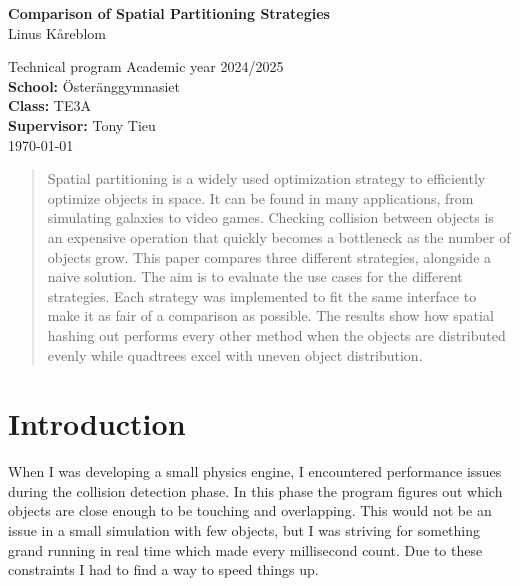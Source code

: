 \documentclass[a4paper, 12pt]{article}
\begin{document}
\begin{titlepage}
    \centering
    \vspace*{1cm}

    {\Huge \textbf{Comparison of Spatial Partitioning Strategies}}\\[1.5cm]

    {\large Linus Kåreblom}\\[1cm]

    \vfill

    Technical program Academic year 2024/2025\\
    \textbf{School:} Österänggymnasiet\\
    \textbf{Class:} TE3A\\
    \textbf{Supervisor:} Tony Tieu\\

    \vspace{1cm}
    {\today}
\end{titlepage}

\begin{abstract}
    Spatial partitioning is a widely used optimization strategy to efficiently
    optimize objects in space. It can be found in many applications, from
    simulating galaxies to video games.
    Checking collision between objects is an expensive operation that quickly
    becomes a bottleneck as the number of objects grow.
    This paper compares three different strategies, alongside a naive solution.
    The aim is to evaluate the use cases for the different strategies.
    Each strategy was implemented to fit the same interface to make it as fair
    of a comparison as possible.
    The results show how spatial hashing out performs every other method when
    the objects are distributed evenly while quadtrees excel with uneven object
    distribution.
\end{abstract}

\newpage

\tableofcontents
\newpage

\section{Introduction}
When I was developing a small physics engine, I encountered performance issues
during the  collision detection phase. In this phase the program figures out
which objects are close enough to be touching and overlapping. This would not be
an issue in a small simulation with few objects, but I was striving for
something grand running in real time which made every millisecond count. Due to
these constraints I had to find a way to speed things up.
\end{document}
